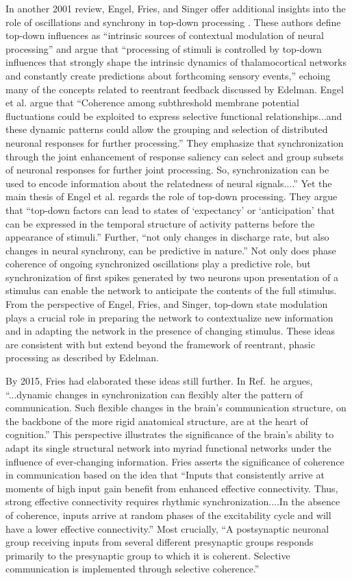 In another 2001 review, Engel, Fries, and Singer offer additional insights into the role of oscillations and synchrony in top-down processing \cite{enfr2001}. These authors define top-down influences as ``intrinsic sources of contextual modulation of neural processing'' and argue that ``processing of stimuli is controlled by top-down influences that strongly shape the intrinsic dynamics of thalamocortical networks and constantly create predictions about forthcoming sensory events,'' echoing many of the concepts related to reentrant feedback discussed by Edelman. Engel et al. argue that ``Coherence among subthreshold membrane potential fluctuations could be exploited to express selective functional relationships...and these dynamic patterns could allow the grouping and selection of distributed neuronal responses for further processing.'' They emphasize that synchronization through the joint enhancement of response saliency can select and group subsets of neuronal responses for further joint processing. So, synchronization can be used to encode information about the relatedness of neural signals....'' Yet the main thesis of Engel et al. regards the role of top-down processing. They argue that ``top-down factors can lead to states of `expectancy' or `anticipation' that can be expressed in the temporal structure of activity patterns before the appearance of stimuli.'' Further, ``not only changes in discharge rate, but also changes in neural synchrony, can be predictive in nature.'' Not only does phase coherence of ongoing synchronized oscillations play a predictive role, but synchronization of first spikes generated by two neurons upon presentation of a stimulus can enable the network to anticipate the contents of the full stimulus. From the perspective of Engel, Fries, and Singer, top-down state modulation plays a crucial role in preparing the network to contextualize new information and in adapting the network in the presence of changing stimulus. These ideas are consistent with but extend beyond the framework of reentrant, phasic processing as described by Edelman.

By 2015, Fries had elaborated these ideas still further. In Ref.\,\cite{fr2015} he argues, ``...dynamic changes in synchronization can flexibly alter the pattern of communication. Such flexible changes in the brain's communication structure, on the backbone of the more rigid anatomical structure, are at the heart of cognition.'' This perspective illustrates the significance of the brain's ability to adapt its single structural network into myriad functional networks under the influence of ever-changing information. Fries asserts the significance of coherence in communication based on the idea that ``Inputs that consistently arrive at moments of high input gain benefit from enhanced effective connectivity. Thus, strong effective connectivity requires rhythmic synchronization....In the absence of coherence, inputs arrive at random phases of the excitability cycle and will have a lower effective connectivity.'' Most crucially, ``A postsynaptic neuronal group receiving inputs from several different presynaptic groups responds primarily to the presynaptic group to which it is coherent. Selective communication is implemented through selective coherence.''

